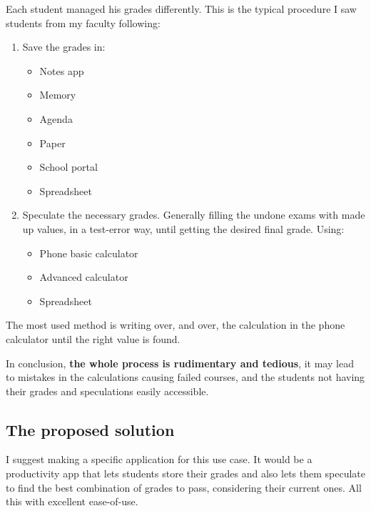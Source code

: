 Each student managed his grades differently. This is the typical procedure I saw students from my faculty following:
\begin{enumerate}
    \item Save the grades in:
    \begin{multicols}{3}
        \begin{itemize}
            \item Notes app
            \item Memory
            \item Agenda
            \item Paper
            \item School portal
            \item Spreadsheet
        \end{itemize}
    \end{multicols}
    \item Speculate the necessary grades. Generally filling the undone exams with made up values, in a test-error way, until getting the desired final grade. Using:
    \begin{multicols}{3}
        \begin{itemize}
            \item Phone basic calculator
            \item Advanced calculator
            \item Spreadsheet
        \end{itemize}
    \end{multicols}
\end{enumerate}

The most used method is writing over, and over, the calculation in the phone calculator until the right value is found. 

In conclusion, \textbf{the whole process is rudimentary and tedious}, it may lead to mistakes in the calculations causing failed courses, and the students not having their grades and speculations easily accessible.

\subsection{The proposed solution}

I suggest making a specific application for this use case. It would be a productivity app that lets students store their grades and also lets them speculate to find the best combination of grades to pass, considering their current ones. All this with excellent ease-of-use.  %

